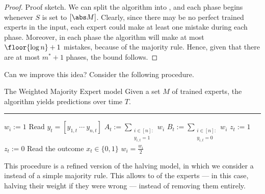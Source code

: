 \documentclass[a4paper, 12pt]{report}
\begin{document}
    \begin{proof}{Proof sketch.}
        We can split the algorithm into , and each phase begins whenever $S$ is set to $[\abs M]$. Clearly, since there may be no perfect trained experts in the input, each expert could make at least one mistake during each phase. Moreover, in each phase the algorithm will make at most $\floor{\log n} + 1$ mistakes, because of the majority rule. Hence, given that there are at most $m^* + 1$ phases, the bound follows.
    \end{proof}

    Can we improve this idea? Consider the following procedure.

    \begin{framedalgo}{The Weighted Majority Expert model}
        Given a set $M$ of trained experts, the algorithm yields predictions over time $T$. \\
        \hrule

        \quad
        \begin{algorithmic}[1]
                    \State $w_i := 1$
                \EndFor
                    \State Read $y_t = [y_{1, t} \ \cdots \ y_{n, t}]$
                    \State $A_t := \sum\limits_{\substack{i \in [n] : \\ y_{i , t} = 1}}{w_i}$
                    \State $B_t := \sum\limits_{\substack{i \in [n] : \\ y_{i , t} = 0}}{w_i}$
                        \State $z_t := 1$
                    \Else
                        \State $z_t := 0$
                    \EndIf
                    \State Read the outcome $x_t \in \{0, 1\}$
                                \State $w_i = \tfrac{w_i}{2}$
                            \EndIf
                        \EndFor
                    \EndIf
                \EndFor
            \EndFunction
        \end{algorithmic}
    \end{framedalgo}
    
    This procedure is a refined version of the halving model, in which we consider a  instead of a simple majority rule. This allows to  of the experts --- in this case, halving their weight if they were wrong --- instead of removing them entirely.
\end{document}
